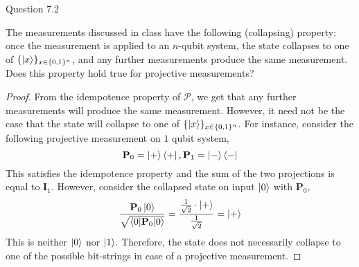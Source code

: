 \begin{solution}{Question 7.2}\label{ques:72}
    \begin{question}
        The measurements discussed in class have the following (collapsing) property: once the measurement is applied to an $n$-qubit system, the state collapses to one of $\{\ket{x}\}_{x\in\{0, 1\}^n}$, and any further measurements produce the same measurement. Does this property hold true for projective measurements?
    \end{question}
    \tcblower{}
    \begin{proof}
        From the idempotence property of $\mathcal{P}$, we get that any further measurements will produce the same measurement. However, it need not be the case that the state will collapse to one of $\{\ket{x}\}_{x\in\{0, 1\}^n}$. For instance, consider the following projective measurement on $1$ qubit system,
        \begin{equation}
            \mathbf{P}_0 = \ket{+}\bra{+}, \mathbf{P}_1 = \ket{-}\bra{-}
        \end{equation}
        This satisfies the idempotence property and the sum of the two projections is equal to $\mathbf{I}_1$. However, consider the collapsed state on input $\ket{0}$ with $\mathbf{P}_0$,
        \begin{equation}
            \frac{\mathbf{P}_0\ket{0}}{\sqrt{\braket{0|\mathbf{P}_0|0}}} = \frac{\frac{1}{\sqrt{2}}\cdot\ket{+}}{\frac{1}{\sqrt{2}}} = \ket{+}
        \end{equation}
        This is neither $\ket{0}$ nor $\ket{1}$. Therefore, the state does not necessarily collapse to one of the possible bit-strings in case of a projective measurement.
    \end{proof}
\end{solution}
